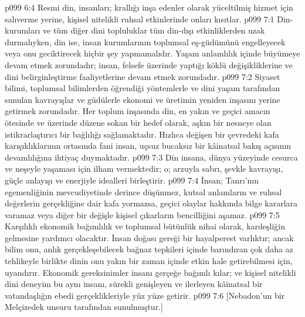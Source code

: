 \vs p099 6:4 Resmi din, insanları; krallığı inşa edenler olarak yüceltilmiş hizmet için salıverme yerine, kişisel nitelikli ruhsal etkinlerinde onları kısıtlar.
\vs p099 7:1 Din\hyp{}kurumları ve tüm diğer dini topluluklar tüm din\hyp{}dışı etkinliklerden uzak durmalıyken, din ise, insan kurumlarının toplumsal eş\hyp{}güdümünü engelleyecek veya onu geciktirecek hiçbir şey yapmamalıdır. Yaşam anlamlılık içinde büyümeye devam etmek zorundadır; insan, felsefe üzerinde yaptığı köklü değişikliklerine ve dini belirginleştirme faaliyetlerine devam etmek zorundadır.
\vs p099 7:2 Siyaset bilimi, toplumsal bilimlerden öğrendiği yöntemlerle ve dini yaşam tarafından sunulan kavrayışlar ve güdülerle ekonomi ve üretimin yeniden inşasını yerine getirmek zorundadır. Her toplum inşasında din, en yakın ve geçici amacın ötesinde ve üzerinde düzene sokan bir hedef olarak, aşkın bir nesneye olan istikrarlaştırıcı bir bağlılığı sağlamaktadır. Hızlıca değişen bir çevredeki kafa karışıklıklarının ortasında fani insan, uçsuz bucaksız bir kâinatsal bakış açısının devamlılığına ihtiyaç duymaktadır.
\vs p099 7:3 Din insana, dünya yüzeyinde cesurca ve neşeyle yaşaması için ilham vermektedir; o; arzuyla sabrı, şevkle kavrayışı, güçle anlayışı ve enerjiyle idealleri birleştirir.
\vs p099 7:4 İnsan; Tanrı’nın egemenliğinin mevcudiyetinde derince düşünmez, kutsal anlamların ve ruhsal değerlerin gerçekliğine dair kafa yormazsa, geçici olaylar hakkında bilge kararlara varamaz veya diğer bir değişle kişisel çıkarların bencilliğini aşamaz.
\vs p099 7:5 Karşılıklı ekonomik bağımlılık ve toplumsal bütünlük nihai olarak, kardeşliğin gelmesine yardımcı olacaktır. İnsan doğası gereği bir hayalperest varlıktır; ancak bilim onu, anlık gerçekleşebilecek bağnaz tepkileri içinde barındıran çok daha az tehlikeyle birlikte dinin onu yakın bir zaman içinde etkin hale getirebilmesi için, uyandırır. Ekonomik gereksinimler insanı gerçeğe bağımlı kılar; ve kişisel nitelikli dini deneyim bu aynı insanı, sürekli genişleyen ve ilerleyen kâinatsal bir vatandaşlığın ebedi gerçeklikleriyle yüz yüze getirir.
\vs p099 7:6 [Nebadon’un bir Melçizedek unsuru tarafından sunulmuştur.]
